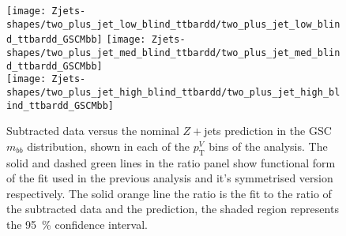 \begin{figure}[!htb]
  \centering
  \texttt{[image: Zjets-shapes/two\_plus\_jet\_low\_blind\_ttbardd/two\_plus\_jet\_low\_blind\_ttbardd\_GSCMbb]}
  \texttt{[image: Zjets-shapes/two\_plus\_jet\_med\_blind\_ttbardd/two\_plus\_jet\_med\_blind\_ttbardd\_GSCMbb]} \\
  \texttt{[image: Zjets-shapes/two\_plus\_jet\_high\_blind\_ttbardd/two\_plus\_jet\_high\_blind\_ttbardd\_GSCMbb]}
  \caption[Subtracted data versus the nominal $Z+$jets prediction, GSC
  $m_{bb}$ across different analysis $p_{\mathrm{T}}^V$ bins.]{Subtracted data
    versus the nominal $Z+$jets prediction in the GSC $m_{bb}$ distribution,
    shown in each of the $p_{\mathrm{T}}^V$ bins of the analysis. The solid and
    dashed green lines in the ratio panel show functional form of the fit used
    in the previous analysis and it's symmetrised version respectively. The
    solid orange line the ratio is the fit to the ratio of the subtracted data
    and the prediction, the shaded region represents the 95~\% confidence
    interval.}
  \label{fig:zjets-mbb-shape-ptv-range}
\end{figure}